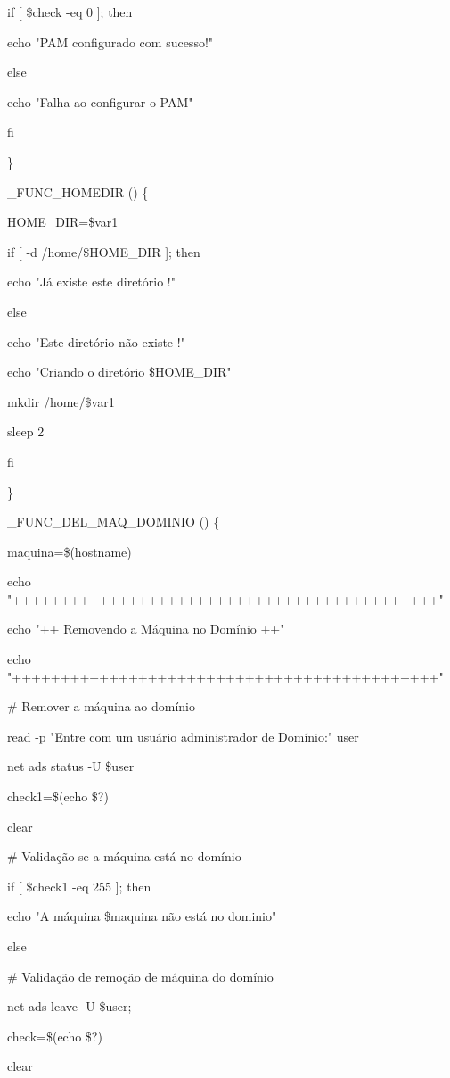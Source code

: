 {   if [ \$check -eq 0 ]; then

      echo "PAM configurado com sucesso!"

   else

      echo "Falha ao configurar o PAM"

   fi

\}

\_FUNC\_HOMEDIR () \{

        HOME\_DIR=\$var1

        if [ -d /home/\$HOME\_DIR ]; then

                echo "Já existe este diretório !"                

        else

                echo "Este diretório não existe !"

                echo "Criando o diretório \$HOME\_DIR"

      mkdir /home/\$var1

                sleep 2

        fi

\}

\_FUNC\_DEL\_MAQ\_DOMINIO () \{

    

   maquina=\$(hostname)

        echo "++++++++++++++++++++++++++++++++++++++++++++"

        echo "++  Removendo a Máquina no Domínio  ++"

        echo "++++++++++++++++++++++++++++++++++++++++++++"
       
        \# Remover a máquina ao domínio

        read -p "Entre com um usuário administrador de Domínio:" user

   net ads status -U \$user

   check1=\$(echo \$?)   

   clear

   \# Validação se a máquina está no domínio

   if [ \$check1 -eq 255 ]; then

      echo "A máquina \$maquina não está no dominio"

   else

      \# Validação de remoção de máquina do domínio

      net ads leave -U \$user;

      check=\$(echo \$?)

      clear

}
